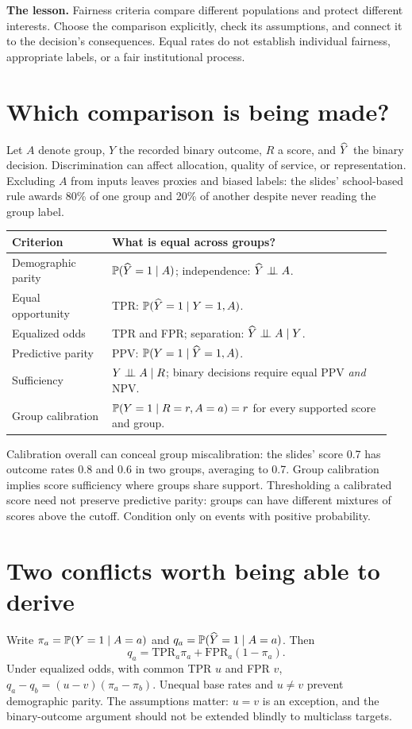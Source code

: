\documentclass[11pt,letterpaper]{article}
\begin{document}

\textbf{The lesson.} Fairness criteria compare different populations and protect
different interests. Choose the comparison explicitly, check its assumptions,
and connect it to the decision's consequences. Equal rates do not establish
individual fairness, appropriate labels, or a fair institutional process.

\section*{Which comparison is being made?}
Let $A$ denote group, $Y$ the recorded binary outcome, $R$ a score, and $\widehat{Y}$
the binary decision. Discrimination can affect allocation, quality of service,
or representation. Excluding $A$ from inputs leaves proxies and biased labels:
the slides' school-based rule awards 80\% of one group and 20\% of another
despite never reading the group label.

\begin{center}
\small
\begin{tabular}{@{}p{0.25\linewidth}p{0.70\linewidth}@{}}
\toprule
Criterion & What is equal across groups? \\
\midrule
Demographic parity & $\mathbb{P}(\widehat{Y}=1\mid A)$; independence: $\widehat{Y}\mathrel{\perp\!\!\!\perp} A$. \\
Equal opportunity & TPR: $\mathbb{P}(\widehat{Y}=1\mid Y=1,A)$. \\
Equalized odds & TPR and FPR; separation: $\widehat{Y}\mathrel{\perp\!\!\!\perp} A\mid Y$. \\
Predictive parity & PPV: $\mathbb{P}(Y=1\mid\widehat{Y}=1,A)$. \\
Sufficiency & $Y\mathrel{\perp\!\!\!\perp} A\mid R$; binary decisions require equal PPV \emph{and} NPV. \\
Group calibration & $\mathbb{P}(Y=1\mid R=r,A=a)=r$ for every supported score and group. \\
\bottomrule
\end{tabular}
\end{center}

Calibration overall can conceal group miscalibration: the slides' score 0.7 has
outcome rates 0.8 and 0.6 in two groups, averaging to 0.7. Group calibration
implies score sufficiency where groups share support. Thresholding a calibrated
score need not preserve predictive parity: groups can have different mixtures
of scores above the cutoff. Condition only on events with positive probability.

\section*{Two conflicts worth being able to derive}
Write $\pi_a=\mathbb{P}(Y=1\mid A=a)$ and $q_a=\mathbb{P}(\widehat{Y}=1\mid A=a)$. Then
\[
q_a=\mathrm{TPR}_a\pi_a+\mathrm{FPR}_a(1-\pi_a).
\]
Under equalized odds, with common TPR $u$ and FPR $v$,
$q_a-q_b=(u-v)(\pi_a-\pi_b)$. Unequal base rates and $u\ne v$ prevent
demographic parity. The assumptions matter: $u=v$ is an exception, and the
binary-outcome argument should not be extended blindly to multiclass targets.
\end{document}
